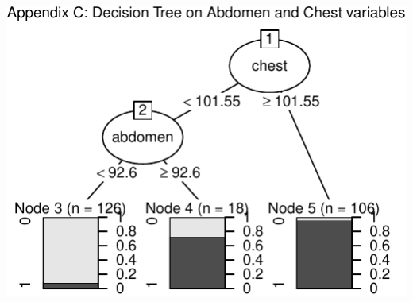 \documentclass[a4paper,9pt,twocolumn,twoside,]{pinp}
\begin{document}
\begin{center}\includegraphics{Executive_Report_files/figure-latex/unnamed-chunk-6-1} \end{center}





\end{document}
